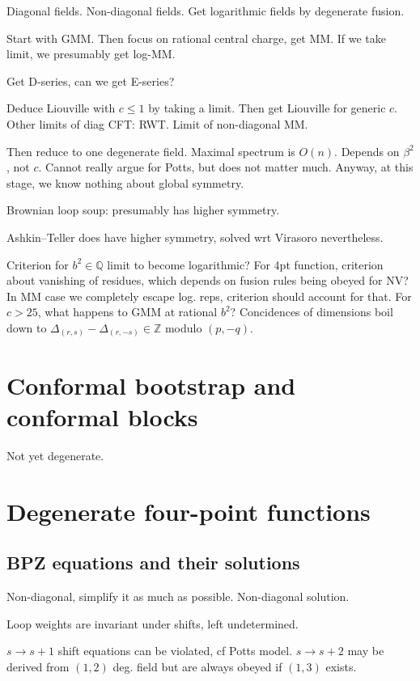 \documentclass[12pt, a4paper]{article}
\theoremstyle{break}
\begin{document}
Diagonal fields. Non-diagonal fields. Get logarithmic fields by degenerate fusion.

Start with GMM. Then focus on rational central charge, get MM. If we take limit, we presumably get log-MM. 

Get D-series, can we get E-series? 

Deduce Liouville with $c\leq 1$ by taking a limit. Then get Liouville for generic $c$. Other limits of diag CFT: RWT. Limit of non-diagonal MM.

Then reduce to one degenerate field. Maximal spectrum is $O(n)$. Depends on $\beta^2$, not $c$. Cannot really argue for Potts, but does not matter much. Anyway, at this stage, we know nothing about global symmetry.

Brownian loop soup: presumably has higher symmetry.

Ashkin--Teller does have higher symmetry, solved wrt Virasoro nevertheless.

Criterion for $b^2\in\mathbb{Q}$ limit to become logarithmic? For 4pt function, criterion about vanishing of residues, which depends on fusion rules being obeyed for NV? In MM case we completely escape log. reps, criterion should account for that.  
For $c>25$, what happens to GMM at rational $b^2$? Concidences of dimensions boil down to $\Delta_{(r,s)}-\Delta_{(r,-s)} \in \mathbb{Z}$ modulo $(p, -q)$. 

\section{Conformal bootstrap and conformal blocks}

Not yet degenerate. 

\section{Degenerate four-point functions}

\subsection{BPZ equations and their solutions}

Non-diagonal, simplify it as much as possible. Non-diagonal solution. 

Loop weights are invariant under shifts, left undetermined. 

$s\to s+1$ shift equations can be violated, cf Potts model. $s\to s+2$ may be derived from $(1,2)$ deg. field but are always obeyed if $(1,3)$ exists. 
\end{document}
